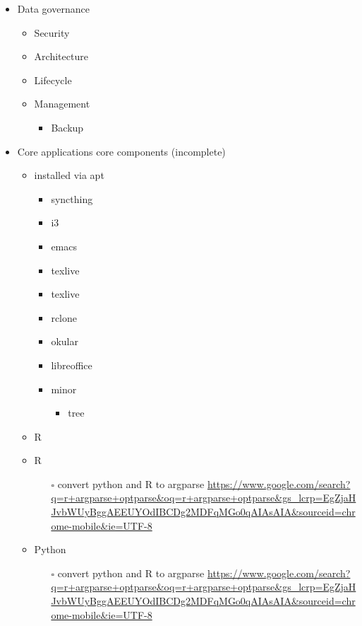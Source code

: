 \documentclass{article}
\begin{document}
\begin{itemize}
\begin{center}
\end{center}
\item Data governance
\label{sec:orgb4d7fa4}
\begin{itemize}
\item Security
\label{sec:org8fba1ec}
\item Architecture
\label{sec:orge05c731}
\item Lifecycle
\label{sec:orgf9b265e}
\item Management
\label{sec:org80135d9}
\begin{itemize}
\item Backup
\label{sec:org509bb10}
\end{itemize}
\end{itemize}
\item Core applications
\label{sec:org2ee34ef}
core components (incomplete)
\begin{itemize}
\item installed via apt
\begin{itemize}
\item syncthing
\item i3
\item emacs
\item texlive
\item texlive
\item rclone
\item okular
\item libreoffice
\item minor
\begin{itemize}
\item tree
\end{itemize}
\end{itemize}
\item R
\end{itemize}
\begin{itemize}
\item R
\label{sec:org25eb239}
\begin{itemize}
\item[{$\square$}] convert python and R to argparse \url{https://www.google.com/search?q=r+argparse+optparse\&oq=r+argparse+optparse\&gs\_lcrp=EgZjaHJvbWUyBggAEEUYOdIBCDg2MDFqMGo0qAIAsAIA\&sourceid=chrome-mobile\&ie=UTF-8}
\end{itemize}
\item Python
\label{sec:org33608a2}
\begin{itemize}
\item[{$\square$}] convert python and R to argparse \url{https://www.google.com/search?q=r+argparse+optparse\&oq=r+argparse+optparse\&gs\_lcrp=EgZjaHJvbWUyBggAEEUYOdIBCDg2MDFqMGo0qAIAsAIA\&sourceid=chrome-mobile\&ie=UTF-8}
\end{itemize}


\end{itemize}
\end{itemize}
\end{document}
